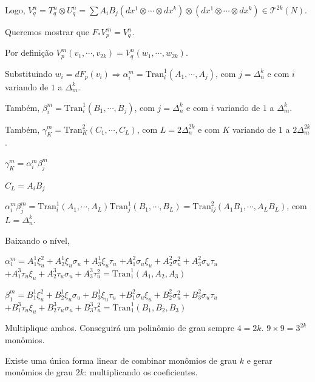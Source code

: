 \documentclass[10pt,a4paper]{article}
\begin{document}
		Logo, $V_q^n = T_q^n \otimes U_q^n = \sum A_i B_j (dx^1 \otimes \cdots \otimes dx^k) \otimes (dx^1 \otimes \cdots \otimes dx^k) \in \mathcal{T}^{2k}(N)$.

		\vspace{3mm}

		Queremos mostrar que $F_* V_p^m = V_q^n$.

		Por defini\c{c}\~ao $V^m_p (v_1, \cdots, v_{2k}) = V_q^n (w_1, \cdots, w_{2k})$.

		\vspace{3mm}

		Substituindo $w_i = dF_p(v_i) \Rightarrow \alpha_i^m = \text{Tran}_i^1(A_1, \cdots, A_j)$, com $j = \Delta_n^k$ e com $i$ variando de $1$ a $\Delta_m^k$.

		\vspace{3mm}

		Tamb\'em, $\beta_i^m = \text{Tran}_i^1(B_1, \cdots, B_j)$, com $j = \Delta_n^k$ e com $i$ variando de $1$ a $\Delta_m^k$.

		\vspace{3mm}

		Tamb\'em, $\gamma_K^m = \text{Tran}_K^2(C_1, \cdots, C_L)$, com $L = 2\Delta_n^{2k}$ e com $K$ variando de $1$ a $2\Delta_m^{2k}$.

		$\gamma_K^m = \alpha_i^m \beta_j^m$

		$C_L = A_i B_j$

		$\alpha_i^m \beta_j^m = \text{Tran}_i^1(A_1, \cdots, A_L) \text{Tran}_j^1(B_1, \cdots, B_L) = \text{Tran}_{ij}^2(A_1 B_1, \cdots, A_L B_L)$, com $L= \Delta_n^k$.

		\vspace{3mm}

		Baixando o n\'ivel,

		$\alpha_1^m = A_1^1 \xi_u^2  + A_2^1 \xi_u \sigma_u  + A_3^1 \xi_u \tau_u$
		$+ A_1^2 \sigma_u \xi_u  + A_2^2 \sigma_u^2  + A_3^2 \sigma_u \tau_u$
		$+ A_1^3 \tau_u \xi_u  + A_2^3 \tau_u \sigma_u  + A_3^3 \tau_u^2 = \text{Tran}_1^1(A_1,A_2,A_3)$

		$\beta_1^m = B_1^1 \xi_u^2  + B_2^1 \xi_u \sigma_u  + B_3^1 \xi_u \tau_u$
		$+ B_1^2 \sigma_u \xi_u  + B_2^2 \sigma_u^2  + B_3^2 \sigma_u \tau_u$
		$+ B_1^3 \tau_u \xi_u  + B_2^3 \tau_u \sigma_u  + B_3^3 \tau_u^2 = \text{Tran}_1^1(B_1,B_2,B_3)$

		Multiplique ambos. Conseguir\'a um polin\^omio de grau sempre $4 = 2k$. $9 \times 9 = 3^{2k}$ mon\^omios.

		Existe uma \'unica forma linear de combinar mon\^omios de grau $k$ e gerar mon\^omios de grau $2k$: multiplicando os coeficientes.
\end{document}
